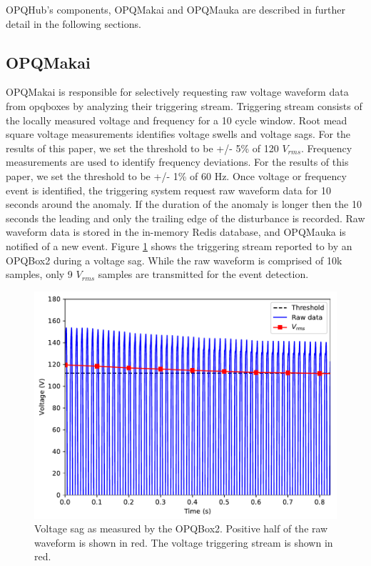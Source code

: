\documentclass[a4paper, conference]{IEEEtran}
\begin{document}
OPQHub's components, OPQMakai and OPQMauka are described in further detail in the following sections.

\subsection{OPQMakai}

OPQMakai is responsible for selectively requesting raw voltage waveform data from opqboxes by analyzing their triggering stream. Triggering stream consists of the locally measured voltage and frequency for a 10 cycle window. Root mead square voltage measurements identifies voltage swells and voltage sags. For the results of this paper, we set the threshold to be +/- 5\% of 120 $V_{rms}$. 
Frequency measurements are used to identify frequency deviations. For the results of this paper, we set the threshold to be +/- 1\% of 60 Hz. Once voltage or frequency event is identified, the triggering system request raw waveform data for 10 seconds around the anomaly. If the duration of the anomaly is longer then the 10 seconds the leading and only the trailing edge of the disturbance is recorded. Raw waveform data is stored in the in-memory Redis database, and OPQMauka is notified of a new event.
Figure \ref{fig:event1} shows the triggering stream reported to by an OPQBox2 during a voltage sag. While the raw waveform is comprised of 10k samples, only 9 $V_{rms}$ samples are transmitted for the event detection.

\begin{figure}[h]
    \centering
    \includegraphics[width=0.9\columnwidth]{img/single_device_sag.pdf}
    \caption{Voltage sag as measured by the OPQBox2. Positive half of the raw waveform is shown in red. The voltage triggering stream is shown in red.}
    \label{fig:event1}
\end{figure}
\end{document}
